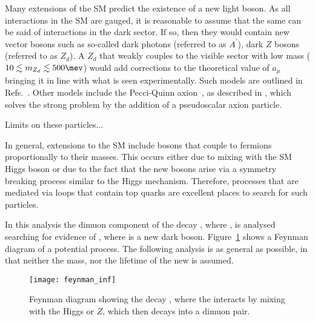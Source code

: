 Many extensions of the SM predict the existence of a new light boson.
As all interactions in the SM are gauged, it is reasonable to assume that the same can be said of
interactions in the dark sector.
If so, then they would contain new vector bosons such as so-called dark photons (referred to as
$A^{\prime}$), dark $Z$ bosons (referred to as $Z_d$).
A $Z_d$ that weakly couples to the visible sector with low mass
($10\lesssim m_{Z_d}\lesssim500\mev$) would add corrections to the theoretical value of $a_\mu$
bringing it in line with what is seen experimentally.
Such models are outlined in Refs.~\cite{Davoudiasl:2012qa,Davoudiasl:2012ag,Lee:2014lga}.
Other models include the Pecci-Quinn axion~\cite{PhysRevLett.38.1440}, as described in ,
which solves the strong \CP problem by the addition of a pseudoscalar axion particle.

Limits on these particles...


In general, extensions to the SM include bosons that couple to fermions proportionally to
their masses.
This occurs either due to mixing with the SM Higgs boson or due to the fact that the
new bosons arise via a symmetry breaking process similar to the Higgs mechanism.
Therefore, processes that are mediated via loops that contain top quarks are excellent places to
search for such particles.

In this analysis the dimuon component of the decay \btokstrmumu, where \kstartokpi, is analysed
searching for evidence of \dbtomumu, where \db is a new dark boson.
Figure~\ref{fig:feynman} shows a Feynman diagram of a potential process.
The following analysis is as general as possible, in that neither the mass, nor the lifetime of the
new \db is assumed.

\begin{figure}
  \begin{center}
    \texttt{[image: feynman\_inf]}
  \caption{
    Feynman diagram showing the decay \btokstrdb, where the \db interacts by mixing with the
    Higgs or $Z$, which then decays into a dimuon pair.
  }
  \label{fig:feynman}
\end{center}
\end{figure}

